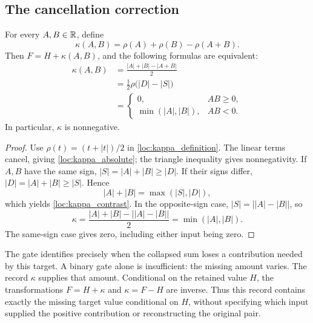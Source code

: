 \subsection{The cancellation correction}
\label{loc:pair_correction}

\begin{proposition}
\label{loc:pair_prop}
For every $A,B\in\mathbb R$, define
\begin{equation}
 \kappa(A,B)=\rho(A)+\rho(B)-\rho(A+B).
 \label{loc:kappa_definition}
\end{equation}
Then $F=H+\kappa(A,B)$, and the following formulas are equivalent:
\begin{align}
 \kappa(A,B)
 &=\frac{|A|+|B|-|A+B|}{2}
 \label{loc:kappa_absolute}\\
 &=\frac12\rho\bigl(|D|-|S|\bigr)
 \label{loc:kappa_contrast}\\
 &=\begin{cases}
       0,&AB\ge0,\\
       \min(|A|,|B|),&AB<0.
    \end{cases}
 \label{loc:kappa_gate}
\end{align}
In particular, $\kappa$ is nonnegative.
\end{proposition}

\begin{proof}
Use $\rho(t)=(t+|t|)/2$ in \eqref{loc:kappa_definition}. The linear terms
cancel, giving \eqref{loc:kappa_absolute}; the triangle inequality gives
nonnegativity. If $A,B$ have the same sign, $|S|=|A|+|B|\ge|D|$. If their
signs differ, $|D|=|A|+|B|\ge|S|$. Hence
\[
 |A|+|B|=\max(|S|,|D|),
\]
which yields \eqref{loc:kappa_contrast}. In the opposite-sign case,
$|S|=\bigl||A|-|B|\bigr|$, so
\[
 \kappa=\frac{|A|+|B|-\bigl||A|-|B|\bigr|}{2}
        =\min(|A|,|B|).
\]
The same-sign case gives zero, including either input being zero.
\end{proof}

The gate identifies precisely when the collapsed sum loses a contribution
needed by this target. A binary gate alone is insufficient: the missing
amount varies. The record $\kappa$ supplies that amount. Conditional on the
retained value $H$, the transformations $F=H+\kappa$ and $\kappa=F-H$ are
inverse. Thus this record contains exactly the missing target value
conditional on $H$, without specifying which input supplied the positive
contribution or reconstructing the original pair.

